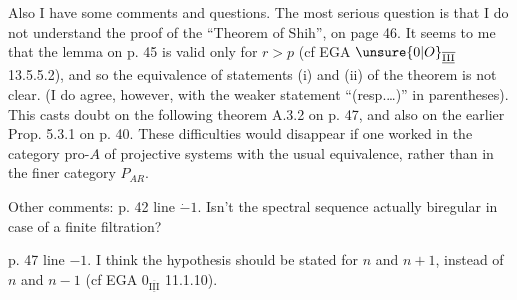 Also I have some comments and questions. The most serious question is that I do not understand the proof of the ``Theorem of Shih'',  on page 46. It seems to me that the lemma on p. 45 is valid only for \(r>p\) (cf EGA \(\unsure{0|O}_{\overline{\underline{\mathrm{III}}}}\) 13.5.5.2), and so  the equivalence of statements (i) and (ii) of the theorem is not clear. (I do agree, however, with the weaker statement ``(resp.\ldots)'' in parentheses). This casts doubt on the following theorem A.3.2 on p. 47, and also on the earlier Prop. 5.3.1 on p. 40. These difficulties would disappear if one worked  in the category \(\mathrm{pro}\text{-}A\)  of projective systems with the usual equivalence, rather than in the  finer category \(P_{AR}\).

Other comments: p. 42 line \(\dot{-}1\). Isn't the spectral sequence actually biregular in case of a finite filtration?

p. 47 line \(-1\). I think the hypothesis should be stated for \(n\) and \(n+1\), instead of \(n\) and \(n-1\) (cf EGA \(0_{\overline{\underline{\mathrm{III}}}}\) 11.1.10).
\clearpage
